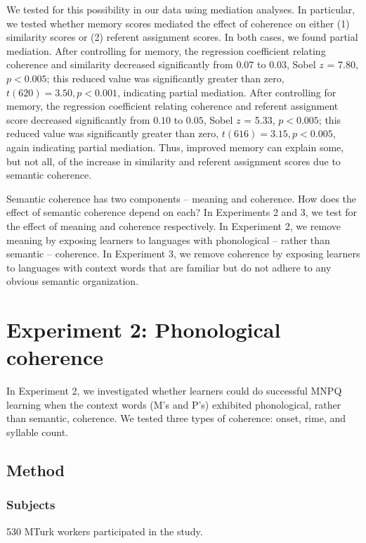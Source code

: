 \documentclass[man,floatsintext]{apa6}
\begin{document}
We tested for this possibility in our data using mediation analyses. In particular, we tested whether memory scores mediated the effect of coherence on either (1) similarity scores or (2) referent assignment scores. In both cases, we found partial mediation. After controlling for memory, the regression coefficient relating coherence and similarity decreased significantly from $0.07$ to $0.03$, Sobel $z$ = 7.80, $p < 0.005$; this reduced value was significantly greater than zero, $t(620) = 3.50, p < 0.001$, indicating partial mediation. After controlling for memory, the regression coefficient relating coherence and referent assignment score decreased significantly from $0.10$ to $0.05$, Sobel $z$ = 5.33, $p < 0.005$; this reduced  value was significantly greater than zero, $t(616) = 3.15, p < 0.005$, again indicating partial mediation. Thus, improved memory can explain some, but not all, of the increase in similarity and referent assignment scores due to semantic coherence.

Semantic coherence has two components -- meaning and coherence. How does the effect of semantic coherence depend on each? In Experiments 2 and 3, we test for the effect of meaning and coherence respectively. In Experiment 2, we remove meaning by exposing learners to languages with phonological -- rather than semantic -- coherence. In Experiment 3, we remove coherence by exposing learners to languages with context words that are familiar but do not adhere to any obvious semantic organization.

\section{Experiment 2: Phonological coherence}

In Experiment 2, we investigated whether learners could do successful MNPQ learning when the context words (M's and P's) exhibited phonological, rather than semantic, coherence. We tested three types of coherence: onset, rime, and syllable count.

\subsection{Method}
\subsubsection{Subjects} 530 MTurk workers participated in the study.
\end{document}
